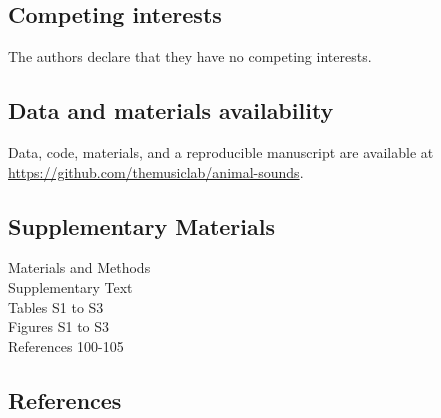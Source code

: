 \documentclass[
]{article}
\begin{document}
\subsection{Competing interests}\label{competing-interests}

The authors declare that they have no competing interests.

\subsection{Data and materials
availability}\label{data-and-materials-availability}

Data, code, materials, and a reproducible manuscript are available at
\url{https://github.com/themusiclab/animal-sounds}.

\subsection{Supplementary Materials}\label{supplementary-materials}

Materials and Methods\\
Supplementary Text\\
Tables S1 to S3\\
Figures S1 to S3\\
References 100-105

\subsection{References}\label{references}

\footnotesize
\end{document}
